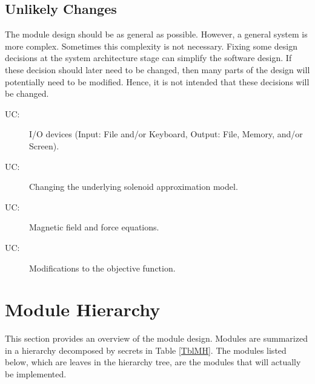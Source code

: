 \documentclass[12pt, titlepage]{article}
\newcounter{ucnum}
\newcommand{\uctheucnum}{UC\theucnum}
\begin{document}
\subsection{Unlikely Changes} \label{SecUchange}

The module design should be as general as possible. However, a general system is
more complex. Sometimes this complexity is not necessary. Fixing some design
decisions at the system architecture stage can simplify the software design. If
these decision should later need to be changed, then many parts of the design
will potentially need to be modified. Hence, it is not intended that these
decisions will be changed.

\begin{description}
\item[ \uctheucnum \label{ucIO}:] I/O devices
  (Input: File and/or Keyboard, Output: File, Memory, and/or Screen).
  \item[ \uctheucnum \label{ucSolApprox}:] Changing the underlying solenoid approximation model.
  \item[ \uctheucnum \label{ucFieldForce}:] Magnetic field and force equations.
  \item[ \uctheucnum \label{ucObjFunc}:] Modifications to the objective function. 
\end{description}

\section{Module Hierarchy} \label{SecMH}

This section provides an overview of the module design. Modules are summarized
in a hierarchy decomposed by secrets in Table \ref{TblMH}. The modules listed
below, which are leaves in the hierarchy tree, are the modules that will
actually be implemented.
\end{document}
